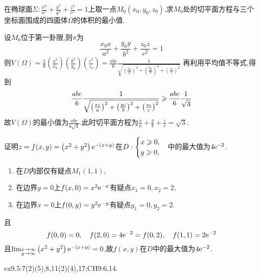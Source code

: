 \begin{example}
    在椭球面$\Sigma: \frac{x^2}{a^2} + \frac{y^2}{b^2} + \frac{z^2}{c^2} = 1$上取一点$M_0(x_0,y_0,z_0)$,求$M_0$处的切平面方程与三个坐标面围成的四面体$\Omega$的体积的最小值.
\end{example}

\begin{solution}
    设$M_0$位于第一卦限,则$\pi$为$$\frac{x_0x}{a^2} + \frac{y_0y}{b^2} + \frac{z_0z}{c^2} = 1$$
    则$V(\Omega) = \frac16 \left( \frac{a^2}{x_0} \right) \left( \frac{b^2}{y_0} \right) \left( \frac{c^2}{z_0} \right) = \frac{abc}{6} \frac{1}{\sqrt{\left(\frac{x_0}{a}\right)^2 + \left(\frac{y_0}{b}\right)^2 + \left(\frac{z_0}{c}\right)^2}}$
    再利用平均值不等式,得到
    $$\frac{abc}{6} \frac{1}{\sqrt{\left(\frac{x_0}{a}\right)^2 + \left(\frac{y_0}{b}\right)^2 + \left(\frac{z_0}{c}\right)^2}} \geqslant \frac{abc}{6} \frac{1}{\sqrt{3}}$$
    故$V(\Omega)$的最小值为$\frac{abc}{6\sqrt{3}}$.此时切平面方程为$\frac{x}{a} + \frac{y}{b} + \frac{z}{c} = \sqrt{3}$.
\end{solution}

\begin{example}
    证明$z=f(x,y) = \left( x^2 + y^2 \right) \mathrm{e}^{-(x+y)}$在$D :\begin{cases}
        x \geqslant 0,\\
        y \geqslant 0,
    \end{cases}$中的最大值为$4\mathrm{e}^{-2}$.
\end{example}

\begin{solution}
    \begin{enumerate}
        \item 在$D$内部仅有疑点$M_1(1,1)$,
        \item 在边界$y=0$上$f(x,0) = x^2\mathrm{e}^{-x}$有疑点$x_1 = 0,x_2 = 2$,
        \item 在边界$x=0$上$f(0,y) = y^2\mathrm{e}^{-y}$有疑点$y_1 = 0,y_2 = 2$.
    \end{enumerate}
    且
    $$f(0,0) = 0,\quad f(2,0) = 4 \mathrm{e}^{-2} = f(0,2), \quad f(1,1) = 2\mathrm{e}^{-2}$$
    且$\lim_{\substack{x \to \infty \\ y \to \infty}} \left( x^2 + y^2 \right) \mathrm{e}^{-(x+y)} = 0$,故$f(x,y)$在$D$中的最大值为$4\mathrm{e}^{-2}$.
\end{solution}

\begin{homework}
    ex9.5:7(2)(5),8,11(2)(4),17;CH9:6,14.
\end{homework}









